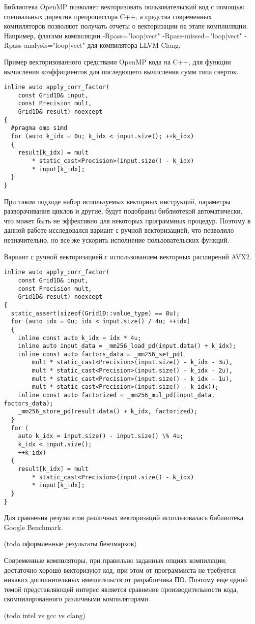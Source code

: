 Библиотека OpenMP позволяет векторизовать пользовательский код с помощью специальных директив препроцессора C++, а средства
современных компиляторов позволяют получать отчеты о векторизации на этапе комплиляции.
Например, флагами компиляции -Rpass="loop|vect" -Rpass-missed="loop|vect" -Rpass-analysis="loop|vect" для компилятора LLVM Clang.

Пример векторизованного средствами OpenMP кода на C++, для функции вычисления коэффициентов для последющего вычисления сумм типа сверток.

\begin{lstlisting}
inline auto apply_corr_factor(
	const Grid1D& input,
	const Precision mult,
	Grid1D& result) noexcept
{
  #pragma omp simd
  for (auto k_idx = 0u; k_idx < input.size(); ++k_idx)
  {
    result[k_idx] = mult 
    	* static_cast<Precision>(input.size() - k_idx)
    	* input[k_idx];
  }
}
\end{lstlisting}

При таком подходе набор используемых векторных инструкций, параметры разворачивания циклов и другие, будут подобраны библиотекой автоматически,
что может быть не эффективно для некоторых программных процедур. Поэтому в данной работе исследовался вариант с ручной векторизацией,
что позволило незначительно, но все же ускорить исполнение пользовательских функций.

Вариант с ручной векторизацией с использованием векторных расширений AVX2.

\begin{lstlisting}
inline auto apply_corr_factor(
	const Grid1D& input,
	const Precision mult,
	Grid1D& result) noexcept
{
  static_assert(sizeof(Grid1D::value_type) == 8u);
  for (auto idx = 0u; idx < input.size() / 4u; ++idx)
  {
    inline const auto k_idx = idx * 4u;
    inline auto input_data = _mm256_load_pd(input.data() + k_idx);
    inline const auto factors_data = _mm256_set_pd(
        mult * static_cast<Precision>(input.size() - k_idx - 3u),
        mult * static_cast<Precision>(input.size() - k_idx - 2u),
        mult * static_cast<Precision>(input.size() - k_idx - 1u),
        mult * static_cast<Precision>(input.size() - k_idx));
    inline const auto factorized = _mm256_mul_pd(input_data, factors_data);
    _mm256_store_pd(result.data() + k_idx, factorized);
  }
  for (
  	auto k_idx = input.size() - input.size() \% 4u;
  	k_idx < input.size();
  	++k_idx) 
  {
    result[k_idx] = mult
    	* static_cast<Precision>(input.size() - k_idx)
    	* input[k_idx];
  }
}
\end{lstlisting}

Для сравнения результатов различных векторизаций использовалась библиотека Google Benchmark.

(todo оформленные результаты бенчмарков)

Современные компиляторы, при правильно заданных опциях компиляции, достаточно хорошо векторизуют код,
при этом от программиста не требуется никаких дополнительных вмешательств от разработчика ПО.
Поэтому еще одной темой представляющей интерес является сравнение производительности кода,
скомпилированного различными компиляторами.

(todo intel vs gcc vs clang)

\clearpage